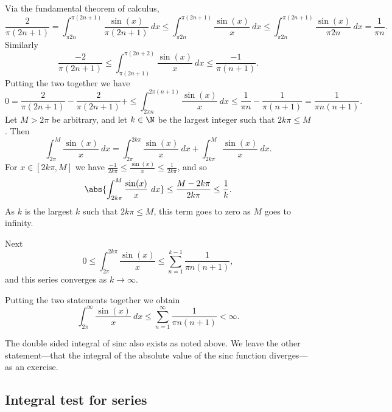 \documentclass[12pt]{book}
\begin{document}
\begin{example}
Via the fundamental theorem of calculus,
\begin{equation*}
\frac{2}{\pi (2n+1)}
=
\int_{\pi 2n}^{\pi (2n+1)}
\frac{\sin(x)}{\pi (2n+1)}
~dx
\leq
\int_{\pi 2n}^{\pi (2n+1)}
\frac{\sin(x)}{x}
~dx
\leq
\int_{\pi 2n}^{\pi (2n+1)}
\frac{\sin(x)}{\pi 2n}
~dx
=
\frac{1}{\pi n} .
\end{equation*}
Similarly
\begin{equation*}
\frac{-2}{\pi (2n+1)}
\leq
\int_{\pi (2n+1)}^{\pi (2n+2)}
\frac{\sin(x)}{x}
~dx
\leq
\frac{-1}{\pi (n+1)} .
\end{equation*}
Putting the two together we have
\begin{equation*}
0
=
\frac{2}{\pi (2n+1)}
-
\frac{2}{\pi (2n+1)}
+
\leq
\int_{2\pi n}^{2\pi (n+1)}
\frac{\sin(x)}{x}
~dx
\leq
\frac{1}{\pi n} 
-
\frac{1}{\pi (n+1)} 
=
\frac{1}{\pi n(n+1)} .
\end{equation*}
Let $M > 2\pi$ be arbitrary, and let $k \in \N$
be the largest integer such that $2k\pi \leq M$.
Then
\begin{equation*}
\int_{2\pi}^M \frac{\sin(x)}{x}~dx
=
\int_{2\pi}^{2k\pi} \frac{\sin(x)}{x} ~dx
+
\int_{2k\pi}^{M} \frac{\sin(x)}{x} ~dx .
\end{equation*}
For $x \in [2k\pi,M]$ we have 
$\frac{-1}{2k\pi} \leq \frac{\sin(x)}{x} \leq \frac{1}{2k\pi}$, and so
\begin{equation*}
\abs{\int_{2k\pi}^{M} \frac{\sin(x)}{x} ~dx }  \leq
\frac{M-2k\pi}{2k\pi} \leq \frac{1}{k} .
\end{equation*}
As $k$ is the largest $k$ such that $2k\pi \leq M$,
this term goes to zero as $M$ goes to infinity.

Next
\begin{equation*}
0 \leq
\int_{2\pi}^{2k\pi} \frac{\sin(x)}{x}
\leq
\sum_{n=1}^{k-1}
\frac{1}{\pi n(n+1)} ,
\end{equation*}
and this series converges as $k \to \infty$.

Putting the two statements together we obtain
\begin{equation*}
\int_{2\pi}^\infty \frac{\sin(x)}{x} ~dx \leq \sum_{n=1}^{\infty}
\frac{1}{\pi n(n+1)} < \infty .
\end{equation*}

The double sided integral of sinc also exists as noted above.
We leave the other statement---that the integral
of the absolute value of the sinc function diverges---as an exercise.
\end{example}

\subsection*{Integral test for series}
\end{document}
